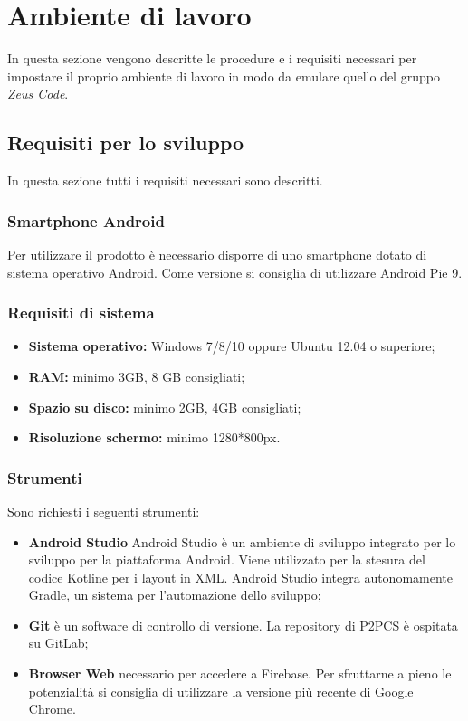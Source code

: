 \section{Ambiente di lavoro}
In questa sezione vengono descritte le procedure e i requisiti necessari per impostare il proprio ambiente di lavoro in modo da emulare quello del gruppo \textit{Zeus Code}.  
\subsection{Requisiti per lo sviluppo}
In questa sezione tutti i requisiti necessari sono descritti.
\subsubsection{Smartphone Android}
Per utilizzare il prodotto è necessario disporre di uno smartphone dotato di sistema operativo Android\glo. Come versione si consiglia di utilizzare Android Pie 9.
\subsubsection{Requisiti di sistema}
\begin{itemize}
	\item \textbf{Sistema operativo:} Windows 7/8/10 oppure Ubuntu 12.04 o superiore;
	\item \textbf{RAM:} minimo 3GB, 8 GB consigliati;
	\item \textbf{Spazio su disco:} minimo 2GB, 4GB consigliati;
	\item \textbf{Risoluzione schermo:} minimo 1280*800px.
\end{itemize}
\subsubsection{Strumenti}
Sono richiesti i seguenti strumenti:
\begin{itemize}
	\item \textbf{Android Studio} Android Studio è un ambiente di sviluppo integrato per lo sviluppo per la piattaforma Android\glosp. Viene utilizzato per la stesura del codice Kotlin\glosp e per i layout in XML\glosp. Android Studio integra autonomamente Gradle, un sistema per l'automazione dello sviluppo;
	\item \textbf{Git} è un software di controllo di versione. La repository di P2PCS è ospitata su GitLab;
	\item \textbf{Browser Web} necessario per accedere a Firebase\glo. Per sfruttarne a pieno le potenzialità si consiglia di utilizzare la versione più recente di Google Chrome.
\end{itemize}
